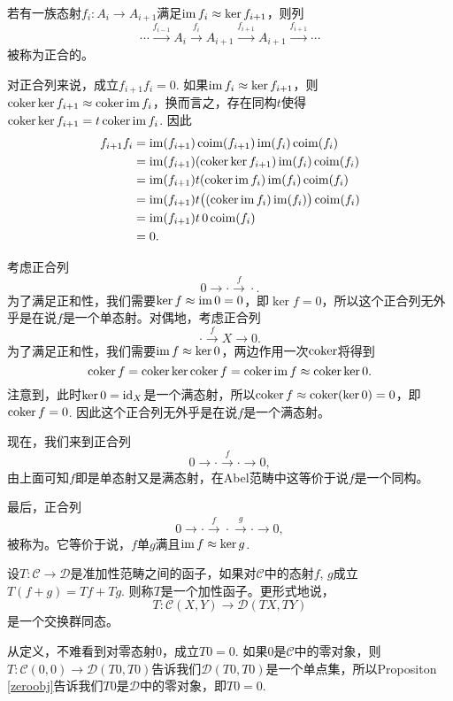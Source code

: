 \begin{para}
若有一族态射$f_i:A_i\to A_{i+1}$满足$\operatorname{im} f_i\approx \ker f_{i+1}$，则列
\[
	\cdots \xrightarrow{f_{i-1}}A_i \xrightarrow{f_i} A_{i+1} \xrightarrow{f_{i+1}} A_{i+1}\xrightarrow{f_{i+1}}\cdots
\]
被称为正合的。
\end{para}

对正合列来说，成立$f_{i+1}f_i=0$. 如果$\operatorname{im} f_i\approx \ker f_{i+1}$，则$\operatorname{coker} \ker f_{i+1} \approx \operatorname{coker} \operatorname{im} f_i$，换而言之，存在同构$t$使得$\operatorname{coker} \ker f_{i+1}=t\operatorname{coker} \operatorname{im} f_i$. 因此
\begin{align*}
f_{i+1}f_i&=\operatorname{im}(f_{i+1})\operatorname{coim}(f_{i+1})\operatorname{im}(f_{i})\operatorname{coim}(f_{i})\\
	&=\operatorname{im}(f_{i+1})(\operatorname{coker} \ker f_{i+1}) \operatorname{im}(f_{i})\operatorname{coim}(f_{i})\\
	&=\operatorname{im}(f_{i+1})t(\operatorname{coker} \operatorname{im} f_i) \operatorname{im}(f_{i})\operatorname{coim}(f_{i})\\
	&=\operatorname{im}(f_{i+1})t\bigl((\operatorname{coker} \operatorname{im} f_i) \operatorname{im}(f_{i})\bigr)\operatorname{coim}(f_{i})\\
	&=\operatorname{im}(f_{i+1})t\,0\operatorname{coim}(f_{i})\\
	&=0.
\end{align*}

\begin{para}[短正合列]
考虑正合列
\[
	0\to \cdot \xrightarrow{f} \cdot.
\]
为了满足正和性，我们需要$\ker f \approx \operatorname{im} 0=0$，即$\ker f = 0$，所以这个正合列无外乎是在说$f$是一个单态射。对偶地，考虑正合列
\[
	\cdot\xrightarrow{f} X \to  0.
\]
为了满足正和性，我们需要$\operatorname{im} f \approx \ker 0$，两边作用一次$\operatorname{coker}$将得到
\[
	\operatorname{coker} f=\operatorname{coker} \ker \operatorname{coker} f=\operatorname{coker} \operatorname{im} f \approx \operatorname{coker} \ker 0.
\]
注意到，此时$\ker 0=\operatorname{id}_X$是一个满态射，所以$\operatorname{coker} f \approx \operatorname{coker}(\ker 0)=0$，即$\operatorname{coker} f = 0$. 因此这个正合列无外乎是在说$f$是一个满态射。

现在，我们来到正合列
\[
	0\to \cdot \xrightarrow{f} \cdot \to 0,
\]
由上面可知$f$即是单态射又是满态射，在Abel范畴中这等价于说$f$是一个同构。

最后，正合列
\[
	0\to \cdot \xrightarrow{f} \cdot \xrightarrow{g}\cdot\to 0,
\]
被称为。它等价于说，$f$单$g$满且$\operatorname{im} f\approx \ker g$.
\end{para}

\begin{para}
设$T:\mathcal{C}\to \mathcal{D}$是准加性范畴之间的函子，如果对$\mathcal{C}$中的态射$f$, $g$成立$T(f+g)=Tf+Tg$. 则称$T$是一个加性函子。更形式地说，
\[
	T:\mathcal{C}(X,Y)\to \mathcal{D}(TX,TY)
\]
是一个交换群同态。
\end{para}

从定义，不难看到对零态射$0$，成立$T0=0$. 如果$0$是$\mathcal{C}$中的零对象，则$T:\mathcal{C}(0,0)\to \mathcal{D}(T0,T0)$告诉我们$\mathcal{D}(T0,T0)$是一个单点集，所以Propositon \ref{zeroobj}告诉我们$T0$是$\mathcal{D}$中的零对象，即$T0=0$.

